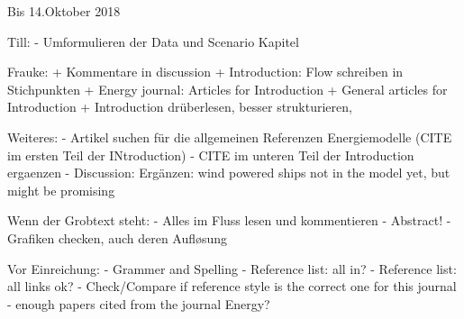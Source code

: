 Bis 14.Oktober 2018

Till:
- Umformulieren der Data und Scenario Kapitel

Frauke:
+ Kommentare in discussion
+ Introduction: Flow schreiben in Stichpunkten
+ Energy journal: Articles for Introduction
+ General articles for Introduction
+ Introduction drüberlesen, besser strukturieren, 

Weiteres:
- Artikel suchen für die allgemeinen Referenzen Energiemodelle (CITE im ersten Teil der INtroduction)
- CITE im unteren Teil der Introduction ergaenzen
- Discussion: Ergänzen: wind powered ships not in the model yet, but might be promising

Wenn der Grobtext steht:
- Alles im Fluss lesen und kommentieren
- Abstract!
- Grafiken checken, auch deren Aufløsung


Vor Einreichung:
- Grammer and Spelling
- Reference list: all in?
- Reference list: all links ok?
- Check/Compare if reference style is the correct one for this journal
- enough papers cited from the journal Energy?
